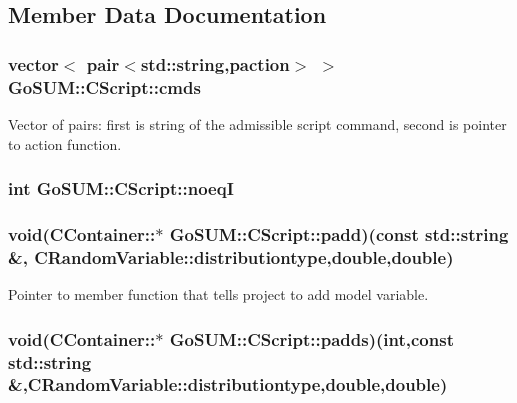 \subsection{Member Data Documentation}
\hypertarget{class_go_s_u_m_1_1_c_script_a8dc1a600d5d66301d94f19ed3f49030c}{
\subsubsection[{cmds}]{\setlength{\rightskip}{0pt plus 5cm}vector$<$ pair$<$std\-::string,{\bf paction}$>$ $>$ Go\-S\-U\-M\-::\-C\-Script\-::cmds\hspace{0.3cm}{\ttfamily [private]}}}\label{class_go_s_u_m_1_1_c_script_a8dc1a600d5d66301d94f19ed3f49030c}


Vector of pairs\-: first is string of the admissible script command, second is pointer to action function. 

\hypertarget{class_go_s_u_m_1_1_c_script_a6e87e334e47c180f9156bd158125e10c}{
\subsubsection[{noeq\-I}]{\setlength{\rightskip}{0pt plus 5cm}int Go\-S\-U\-M\-::\-C\-Script\-::noeq\-I\hspace{0.3cm}{\ttfamily [private]}}}\label{class_go_s_u_m_1_1_c_script_a6e87e334e47c180f9156bd158125e10c}
\hypertarget{class_go_s_u_m_1_1_c_script_ade2f8577d8eb25ddf804f29d250b0d9b}{
\subsubsection[{padd}]{\setlength{\rightskip}{0pt plus 5cm}void(C\-Container\-::$\ast$ Go\-S\-U\-M\-::\-C\-Script\-::padd)(const std\-::string \&, {\bf C\-Random\-Variable\-::distributiontype},double,double)\hspace{0.3cm}{\ttfamily [private]}}}\label{class_go_s_u_m_1_1_c_script_ade2f8577d8eb25ddf804f29d250b0d9b}


Pointer to member function that tells project to add model variable. 

\hypertarget{class_go_s_u_m_1_1_c_script_ac74b46284f8f3bb0840c08d8c4c5599f}{
\subsubsection[{padds}]{\setlength{\rightskip}{0pt plus 5cm}void(C\-Container\-::$\ast$ Go\-S\-U\-M\-::\-C\-Script\-::padds)(int,const std\-::string \&,{\bf C\-Random\-Variable\-::distributiontype},double,double)\hspace{0.3cm}{\ttfamily [private]}}}\label{class_go_s_u_m_1_1_c_script_ac74b46284f8f3bb0840c08d8c4c5599f}


